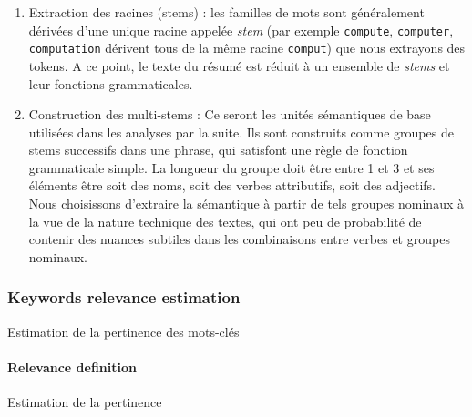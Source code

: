{\begin{enumerate}
	\item Extraction des racines (stems) : les familles de mots sont généralement dérivées d'une unique racine appelée \emph{stem} (par exemple \texttt{compute}, \texttt{computer}, \texttt{computation} dérivent tous de la même racine \texttt{comput}) que nous extrayons des tokens. A ce point, le texte du résumé est réduit à un ensemble de \emph{stems} et leur fonctions grammaticales.
	\item Construction des multi-stems : Ce seront les unités sémantiques de base utilisées dans les analyses par la suite. Ils sont construits comme groupes de stems successifs dans une phrase, qui satisfont une règle de fonction grammaticale simple. La longueur du groupe doit être entre 1 et 3 et ses éléments être soit des noms, soit des verbes attributifs, soit des adjectifs. Nous choisissons d'extraire la sémantique à partir de tels groupes nominaux à la vue de la nature technique des textes, qui ont peu de probabilité de contenir des nuances subtiles dans les combinaisons entre verbes et groupes nominaux. 
\end{enumerate}
}



\subsubsection*{Keywords relevance estimation}{Estimation de la pertinence des mots-clés}
\label{app:subsubsec:keywords_est}
\paragraph{Relevance definition}{Estimation de la pertinence}

